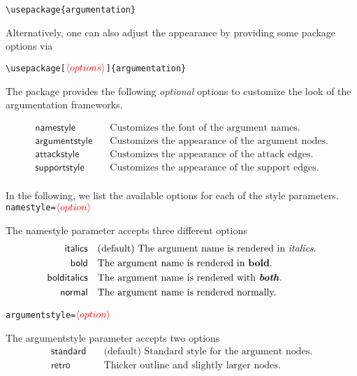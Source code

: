 \documentclass{article}
\newcommand{\opt}[2][red]{\ensuremath{\textcolor{#1}{\langle #2\rangle}}}
\begin{document}
    \noindent
    \verb|\usepackage{argumentation}|

    Alternatively, one can also adjust the appearance by providing some package options via

    \noindent
    \verb|\usepackage[|\opt{options}\verb|]{argumentation}|
    
    \begin{list}{}{\leftmargin=\parindent\rightmargin=0pt}
        \item The package provides the following \emph{optional} options to customize the look of the argumentation frameworks.
    \end{list}
    \begin{align*}
        \mathsf{namestyle} &\quad \text{Customizes the font of the argument names.}\\
        \mathsf{argumentstyle} &\quad \text{Customizes the appearance of the argument nodes.}\\
        \mathsf{attackstyle} &\quad \text{Customizes the appearance of the attack edges.}\\
        \mathsf{supportstyle} &\quad \text{Customizes the appearance of the support edges.}\\
    \end{align*}

    In the following, we list the available options for each of the style parameters.\\

\noindent\texttt{namestyle=}\opt{option}
    
    The \textsf{namestyle} parameter accepts three different options
    \begin{align*}
        \mathsf{italics} &\quad \text{(default) The argument name is rendered in \emph{italics}.}\\
        \mathsf{bold} &\quad \text{The argument name is rendered in \textbf{bold}.}\\
        \mathsf{bolditalics} &\quad \text{The argument name is rendered with \textbf{\emph{both}}.}\\
        \mathsf{normal} &\quad \text{The argument name is rendered normally.}\\
    \end{align*}

\noindent\texttt{argumentstyle=}\opt{option}

    The \textsf{argumentstyle} parameter accepts two options
    \begin{align*}
        \mathsf{standard} &\quad \text{(default) Standard style for the argument nodes.}\\
        \mathsf{retro} &\quad \text{Thicker outline and slightly larger nodes.}\\
    \end{align*}
\end{document}
